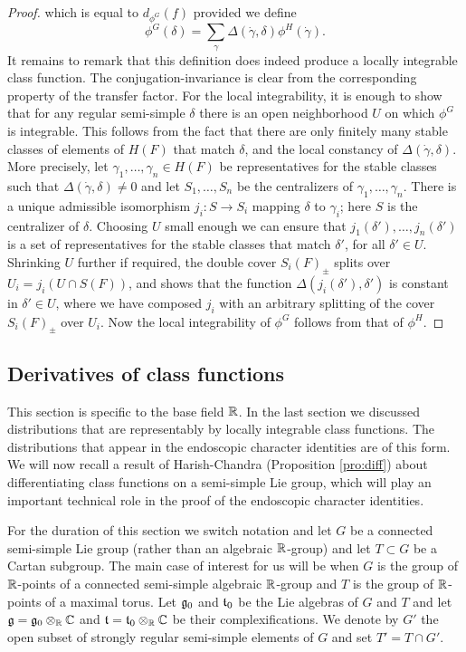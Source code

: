 \documentclass{article}
\theoremstyle{definition}
\numberwithin{equation}{section}
\renewcommand{\-}{\hyp{}}
\begin{document}
\begin{proof}
	which is equal to $d_{\phi^G}(f)$ provided we define
	\begin{equation} \label{eq:x4}
		\phi^G(\delta) = \sum_\gamma \Delta(\dot\gamma,\delta) \phi^H(\dot\gamma).
	\end{equation}
	It remains to remark that this definition does indeed produce a locally integrable class function. The conjugation-invariance is clear from the corresponding property of the transfer factor. For the local integrability, it is enough to show that for any regular semi-simple $\delta$ there is an open neighborhood $U$ on which $\phi^G$ is integrable. This follows from the fact that there are only finitely many stable classes of elements of $H(F)$ that match $\delta$, and the local constancy of $\Delta(\dot\gamma,\delta)$. More precisely, let $\gamma_1,\dots,\gamma_n \in H(F)$ be representatives for the stable classes such that $\Delta(\dot\gamma,\delta) \neq 0$ and let $S_1,\dots,S_n$ be the centralizers of $\gamma_1,\dots,\gamma_n$. There is a unique admissible isomorphism $j_i : S \to S_i$ mapping $\delta$ to $\gamma_i$; here $S$ is the centralizer of $\delta$. Choosing $U$ small enough we can ensure that $j_1(\delta'),\dots,j_n(\delta')$ is a set of representatives for the stable classes that match $\delta'$, for all $\delta' \in U$. Shrinking $U$ further if required, the double cover $S_i(F)_\pm$ splits over $U_i=j_i(U \cap S(F))$, and \cite[Corollary 4.3.4]{KalHDC} shows that the function $\Delta(j_i(\delta'),\delta')$ is constant in $\delta' \in U$, where we have composed $j_i$ with an arbitrary splitting of the cover $S_i(F)_\pm$ over $U_i$. Now the local integrability of $\phi^G$ follows from that of $\phi^H$.
\end{proof}

\subsection{Derivatives of class functions}

This section is specific to the base field $\mathbb{R}$. In the last section we discussed distributions that are representably by locally integrable class functions. The distributions that appear in the endoscopic character identities are of this form. We will now recall a result of Harish-Chandra (Proposition \ref{pro:diff}) about differentiating class functions on a semi-simple Lie group, which will play an important technical role in the proof of the endoscopic character identities.

For the duration of this section we switch notation and let $G$ be a connected semi-simple Lie group (rather than an algebraic $\mathbb{R}$-group) and let $T \subset G$ be a Cartan subgroup. The main case of interest for us will be when $G$ is the group of $\mathbb{R}$-points of a connected semi-simple  algebraic $\mathbb{R}$-group and $T$ is the group of $\mathbb{R}$-points of a maximal torus. Let $\mathfrak{g}_0$ and $\mathfrak{t}_0$ be the Lie algebras of $G$ and $T$ and let $\mathfrak{g}=\mathfrak{g}_0\otimes_{\mathbb{R}}\mathbb{C}$ and $\mathfrak{t}=\mathfrak{t}_0\otimes_{\mathbb{R}}\mathbb{C}$ be their complexifications. We denote by $G'$ the open subset of strongly regular semi-simple elements of $G$ and set $T'=T \cap G'$.
\end{document}
